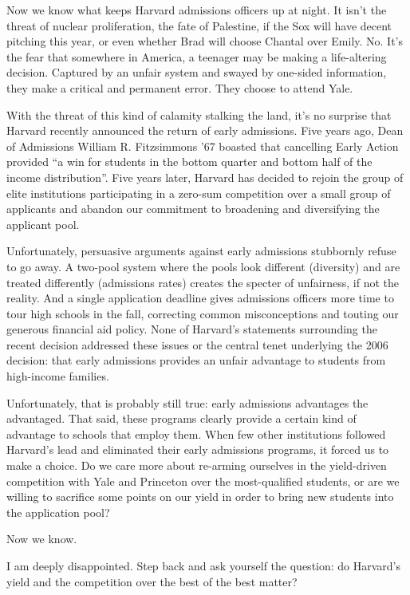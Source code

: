 
Now we know what keeps Harvard admissions officers up at night. It isn't the
threat of nuclear proliferation, the fate of Palestine, if the Sox will have
decent pitching this year, or even whether Brad will choose Chantal over
Emily. No. It's the fear that somewhere in America, a teenager may be making
a life-altering decision. Captured by an unfair system and swayed by
one-sided information, they make a critical and permanent error. They choose
to attend Yale.

With the threat of this kind of calamity stalking the land, it's no surprise
that Harvard recently announced the return of early admissions. Five years
ago, Dean of Admissions William R. Fitzsimmons ’67 boasted that cancelling
Early Action provided ``a win for students in the bottom quarter and bottom
half of the income distribution''. Five years later, Harvard has decided to
rejoin the group of elite institutions participating in a zero-sum
competition over a small group of applicants and abandon our commitment to
broadening and diversifying the applicant pool.

Unfortunately, persuasive arguments against early admissions stubbornly
refuse to go away. A two-pool system where the pools look different
(diversity) and are treated differently (admissions rates) creates the
specter of unfairness, if not the reality. And a single application deadline
gives admissions officers more time to tour high schools in the fall,
correcting common misconceptions and touting our generous financial aid
policy. None of Harvard's statements surrounding the recent decision
addressed these issues or the central tenet underlying the 2006 decision:
that early admissions provides an unfair advantage to students from
high-income families.

Unfortunately, that is probably still true: early admissions advantages the
advantaged. That said, these programs clearly provide a certain kind of
advantage to schools that employ them. When few other institutions followed
Harvard's lead and eliminated their early admissions programs, it forced us
to make a choice. Do we care more about re-arming ourselves in the
yield-driven competition with Yale and Princeton over the most-qualified
students, or are we willing to sacrifice some points on our yield in order to
bring new students into the application pool?

Now we know.

I am deeply disappointed. Step back and ask yourself the question: do
Harvard's yield and the competition over the best of the best matter?

